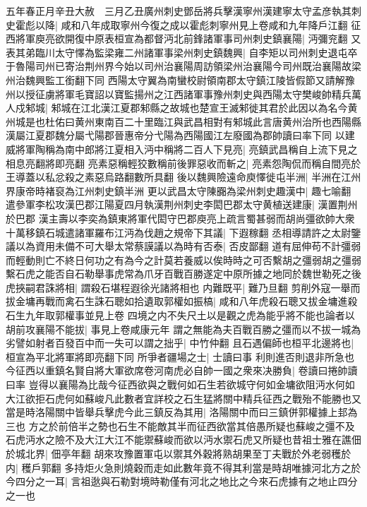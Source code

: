 五年春正月辛丑大赦　三月乙丑廣州刺史鄧岳將兵擊漢寧州漢建寧太守孟彦執其刺史霍彪以降|{
	咸和八年成取寧州今復之成以霍彪刺寧州見上卷咸和九年降戶江翻}
征西將軍庾亮欲開復中原表桓宣為都督沔北前鋒諸軍事司州刺史鎮襄陽|{
	沔彌兖翻}
又表其弟臨川太守懌為監梁雍二州諸軍事梁州刺史鎮魏興|{
	自李矩以司州刺史退屯卒于魯陽司州已寄治荆州界今始以司州治襄陽周訪領梁州治襄陽今司州既治襄陽故梁州治魏興監工銜翻下同}
西陽太守翼為南蠻校尉領南郡太守鎮江陵皆假節又請解豫州以授征虜將軍毛寶詔以寶監揚州之江西諸軍事豫州刺史與西陽太守樊峻帥精兵萬人戍邾城|{
	邾城在江北漢江夏郡邾縣之故城也楚宣王滅邾徙其君於此因以為名今黄州城是也杜佑曰黄州東南百二十里臨江與武昌相對有邾城此言唐黄州治所也西陽縣漢屬江夏郡魏分屬弋陽郡晉惠帝分弋陽為西陽國江左廢國為郡帥讀曰率下同}
以建威將軍陶稱為南中郎將江夏相入沔中稱將二百人下見亮|{
	亮鎮武昌稱自上流下見之相息亮翻將即亮翻}
亮素惡稱輕狡數稱前後罪惡收而斬之|{
	亮素怨陶侃而稱自間亮於王導蓋以私忿殺之素惡烏路翻數所具翻}
後以魏興險遠命庾懌徙屯半洲|{
	半洲在江州界康帝時褚裒為江州刺史鎮半洲}
更以武昌太守陳嚻為梁州刺史趣漢中|{
	趣七喻翻}
遣參軍李松攻漢巴郡江陽夏四月執漢荆州刺史李閎巴郡太守黄植送建康|{
	漢置荆州於巴郡}
漢主壽以李奕為鎮東將軍代閎守巴郡庾亮上疏言蜀甚弱而胡尚彊欲帥大衆十萬移鎮石城遣諸軍羅布江沔為伐趙之規帝下其議|{
	下遐稼翻}
丞相導請許之太尉鑒議以為資用未備不可大舉太常蔡謨議以為時有否泰|{
	否皮鄙翻}
道有屈伸苟不計彊弱而輕動則亡不終日何功之有為今之計莫若養威以俟時時之可否繫胡之彊弱胡之彊弱繫石虎之能否自石勒舉事虎常為爪牙百戰百勝遂定中原所據之地同於魏世勒死之後虎挾嗣君誅將相|{
	謂殺石堪程遐徐光諸將相也}
内難既平|{
	難乃旦翻}
剪削外寇一舉而拔金墉再戰而禽石生誅石聰如拾遺取郭權如振槁|{
	咸和八年虎殺石聰又拔金墉進殺石生九年取郭權事並見上卷}
四境之内不失尺土以是觀之虎為能乎將不能也論者以胡前攻襄陽不能拔|{
	事見上卷咸康元年}
謂之無能為夫百戰百勝之彊而以不拔一城為劣譬如射者百發百中而一失可以謂之拙乎|{
	中竹仲翻}
且石遇偏師也桓平北邊將也|{
	桓宣為平北將軍將即亮翻下同}
所爭者疆場之士|{
	士讀曰事}
利則進否則退非所急也今征西以重鎮名賢自將大軍欲席卷河南虎必自帥一國之衆來决勝負|{
	卷讀曰捲帥讀曰率}
豈得以襄陽為比哉今征西欲與之戰何如石生若欲城守何如金墉欲阻沔水何如大江欲拒石虎何如蘇峻凡此數者宜詳校之石生猛將關中精兵征西之戰殆不能勝也又當是時洛陽關中皆舉兵擊虎今此三鎮反為其用|{
	洛陽關中而曰三鎮併郭權據上邽為三也}
方之於前倍半之勢也石生不能敵其半而征西欲當其倍愚所疑也蘇峻之彊不及石虎沔水之險不及大江大江不能禦蘇峻而欲以沔水禦石虎又所疑也昔祖士雅在譙佃於城北界|{
	佃亭年翻}
胡來攻豫置軍屯以禦其外穀將熟胡果至丁夫戰於外老弱穫於内|{
	穫戶郭翻}
多持炬火急則燒穀而走如此數年竟不得其利當是時胡唯據河北方之於今四分之一耳|{
	言祖逖與石勒對境時勒僅有河北之地比之今來石虎據有之地止四分之一也}
